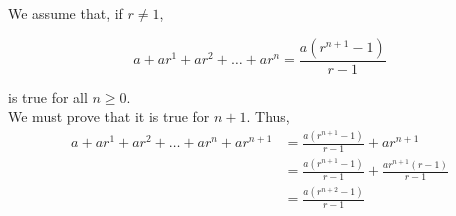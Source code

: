 We assume that, if $r \neq 1$,

\[
    a + ar^1 + ar^2 + \dots + ar^n = \frac{a(r^{n + 1} - 1)}{r - 1}
\]

is true for all $n \geq 0$.\\

We must prove that it is true for $n + 1$.  Thus,
\begin{align*}
    a + ar^1 + ar^2 + \dots + ar^n + ar^{n + 1} &= \frac{a(r^{n + 1} - 1)}{r - 1} + ar^{n + 1}\\
    &= \frac{a(r^{n + 1} - 1)}{r - 1} + \frac{ar^{n + 1}(r - 1)}{r - 1}\\
    &= \frac{a(r^{n + 2} - 1)}{r - 1}
\end{align*}

